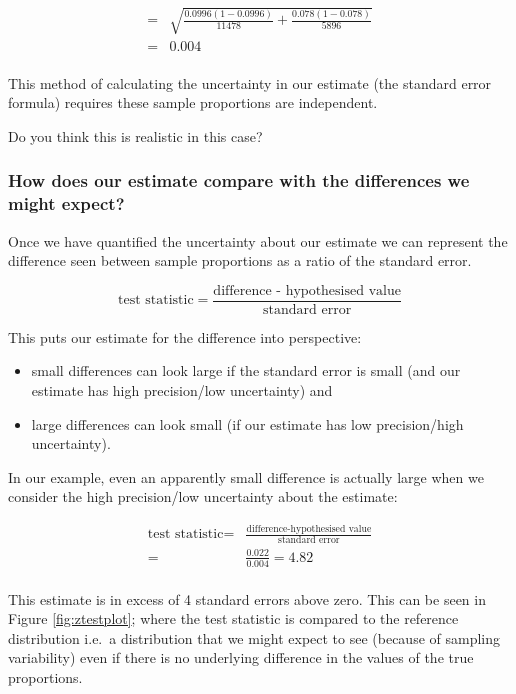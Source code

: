\documentclass[
  oneside]{krantz}
\begin{document}
\begin{align*}
=& \sqrt{\frac{0.0996(1-0.0996)}{11478}+\frac{0.078(1-0.078)}{5896}}\\
= &   0.004\\
\end{align*}

This method of calculating the uncertainty in our estimate (the standard error formula) requires these sample proportions are independent.

Do you think this is realistic in this case?

\hypertarget{how-does-our-estimate-compare-with-the-differences-we-might-expect}{%
\subsubsection{How does our estimate compare with the differences we might expect?}\label{how-does-our-estimate-compare-with-the-differences-we-might-expect}}

Once we have quantified the uncertainty about our estimate we can represent the difference seen between sample proportions as a ratio of the standard error.

\[\text{test statistic} = \frac{\text{difference - hypothesised value}}{\text{standard error}}\]

This puts our estimate for the difference into perspective:

\begin{itemize}
\item
  small differences can look large if the standard error is small (and our estimate has high precision/low uncertainty) and
\item
  large differences can look small (if our estimate has low precision/high uncertainty).
\end{itemize}

In our example, even an apparently small difference is actually large when we consider the high precision/low uncertainty about the estimate:

\begin{align*}
\textrm{test statistic} =&\frac{\textrm{difference-hypothesised value}}{\textrm{standard error}}\\
=& \frac{0.022}{0.004} = 
4.82\\
\end{align*}

This estimate is in excess of 4 standard errors above zero. This can be seen in Figure \ref{fig:ztestplot}; where the test statistic is compared to the reference distribution i.e.~a distribution that we might expect to see (because of sampling variability) even if there is no underlying difference in the values of the true proportions.
\end{document}
